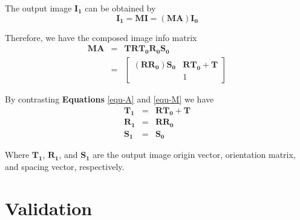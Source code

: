 \documentclass{InsightArticle}
\begin{document}
The output image $\mathbf{I_1}$ can be obtained by
\begin{equation}
\mathbf{I_1} = \mathbf{M}\mathbf{I} = (\mathbf{M}\mathbf{A})\mathbf{I_0}
\end{equation}

Therefore, we have the composed image info matrix
\begin{eqnarray}
\label{equ-M}
\mathbf{M}\mathbf{A} & = & \mathbf{T}\mathbf{R}\mathbf{T_0}\mathbf{R_0}\mathbf{S_0} \nonumber \\
& = &
\left[ {\begin{array}{cc}
(\mathbf{R}\mathbf{R_0})\mathbf{S_0} & \mathbf{R}\mathbf{T_0} + \mathbf{T} \\
 & 1
\end{array} } \right]
\end{eqnarray}

By contrasting \textbf{Equations} \ref{equ-A} and \ref{equ-M} we have
\begin{eqnarray}
\mathbf{T_1} & = & \mathbf{R}\mathbf{T_0} + \mathbf{T} \nonumber \\
\mathbf{R_1} & = & \mathbf{R}\mathbf{R_0} \nonumber \\
\mathbf{S_1} & = & \mathbf{S_0}
\end{eqnarray}

Where $\mathbf{T_1}$, $\mathbf{R_1}$, and $\mathbf{S_1}$ are the output image origin vector, orientation matrix, and spacing vector, respectively.

\section{Validation}
\end{document}
